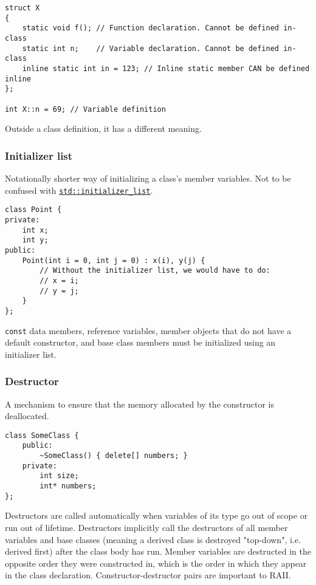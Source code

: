 \documentclass[8pt, table, xcdraw]{article}%
\begin{document}
\begin{lstlisting}
struct X
{
    static void f(); // Function declaration. Cannot be defined in-class
    static int n;    // Variable declaration. Cannot be defined in-class
    inline static int in = 123; // Inline static member CAN be defined inline
};

int X::n = 69; // Variable definition
\end{lstlisting}

Outside a class definition, it has a different meaning.

\subsubsection{Initializer list} \label{initializerlist}
Notationally shorter way of initializing a class's member variables. Not to be confused with \hyperref[stdinitializerlist]{\lstinline{std::initializer_list}}.

\begin{lstlisting}
class Point { 
private: 
    int x; 
    int y; 
public: 
    Point(int i = 0, int j = 0) : x(i), y(j) {
        // Without the initializer list, we would have to do:
        // x = i;
        // y = j;
    } 
}; 
\end{lstlisting}

\lstinline{const} data members, reference variables, member objects that do not have a default constructor, and base class members must be initialized using an initializer list.

\subsubsection{Destructor}
A mechanism to ensure that the memory allocated by the constructor is deallocated.

\begin{lstlisting}
class SomeClass {
    public:
        ~SomeClass() { delete[] numbers; }
    private:
        int size;
        int* numbers;
};
\end{lstlisting}

Destructors are called automatically when variables of its type go out of scope or run out of lifetime. Destructors implicitly call the destructors of all member variables and base classes (meaning a derived class is destroyed "top-down", i.e. derived first) after the class body has run. Member variables are destructed in the opposite order they were constructed in, which is the order in which they appear in the class declaration. Constructor-destructor pairs are important to RAII.
\end{document}
